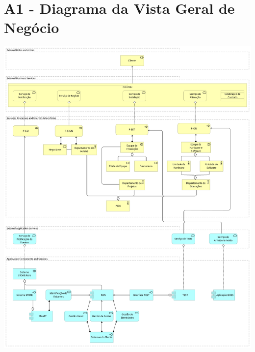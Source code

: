 \documentclass{article}
\begin{document}
\section*{A1 - Diagrama da Vista Geral de Negócio}
\vspace*{\fill}
\includegraphics[width=\textwidth,height=\textheight,keepaspectratio]{A1-1}
\vspace*{\fill}

\pagebreak
\end{document}
